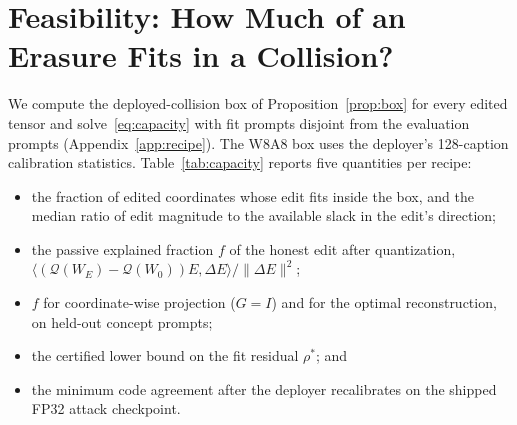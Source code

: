 \documentclass[conference]{IEEEtran}
\begin{document}
\section{Feasibility: How Much of an Erasure Fits in a Collision?}
\label{sec:feasibility}
We compute the deployed-collision box of Proposition~\ref{prop:box} for every edited
tensor and solve~\eqref{eq:capacity} with fit prompts disjoint from the evaluation
prompts (Appendix~\ref{app:recipe}). The W8A8 box uses the deployer's 128-caption
calibration statistics. Table~\ref{tab:capacity} reports five quantities per recipe:
\begin{itemize}
\item the fraction of edited coordinates whose edit fits inside the box, and the
median ratio of edit magnitude to the available slack in the edit's direction;
\item the passive explained fraction $f$ of the honest edit after quantization,
$\langle(\mathcal{Q}(W_E)-\mathcal{Q}(W_0))E,\Delta E\rangle/\|\Delta E\|^2$;
\item $f$ for coordinate-wise projection ($G=I$) and for the optimal reconstruction, on
held-out concept prompts;
\item the certified lower bound on the fit residual $\rho^*$; and
\item the minimum code agreement after the deployer recalibrates on the shipped
FP32 attack checkpoint.
\end{itemize}
\end{document}
